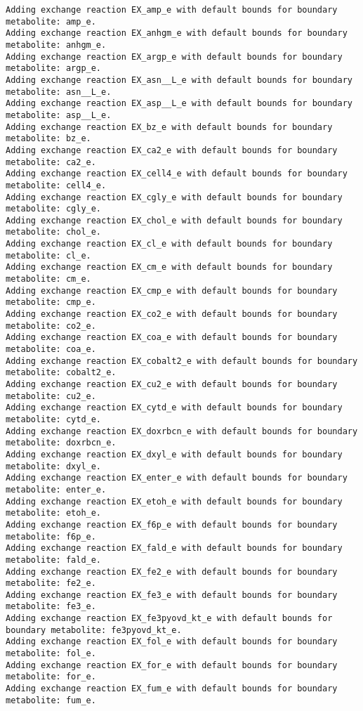 \documentclass[
  letterpaper,
  DIV=11,
  numbers=noendperiod]{scrartcl}
\begin{document}
\begin{verbatim}
Adding exchange reaction EX_amp_e with default bounds for boundary metabolite: amp_e.
Adding exchange reaction EX_anhgm_e with default bounds for boundary metabolite: anhgm_e.
Adding exchange reaction EX_argp_e with default bounds for boundary metabolite: argp_e.
Adding exchange reaction EX_asn__L_e with default bounds for boundary metabolite: asn__L_e.
Adding exchange reaction EX_asp__L_e with default bounds for boundary metabolite: asp__L_e.
Adding exchange reaction EX_bz_e with default bounds for boundary metabolite: bz_e.
Adding exchange reaction EX_ca2_e with default bounds for boundary metabolite: ca2_e.
Adding exchange reaction EX_cell4_e with default bounds for boundary metabolite: cell4_e.
Adding exchange reaction EX_cgly_e with default bounds for boundary metabolite: cgly_e.
Adding exchange reaction EX_chol_e with default bounds for boundary metabolite: chol_e.
Adding exchange reaction EX_cl_e with default bounds for boundary metabolite: cl_e.
Adding exchange reaction EX_cm_e with default bounds for boundary metabolite: cm_e.
Adding exchange reaction EX_cmp_e with default bounds for boundary metabolite: cmp_e.
Adding exchange reaction EX_co2_e with default bounds for boundary metabolite: co2_e.
Adding exchange reaction EX_coa_e with default bounds for boundary metabolite: coa_e.
Adding exchange reaction EX_cobalt2_e with default bounds for boundary metabolite: cobalt2_e.
Adding exchange reaction EX_cu2_e with default bounds for boundary metabolite: cu2_e.
Adding exchange reaction EX_cytd_e with default bounds for boundary metabolite: cytd_e.
Adding exchange reaction EX_doxrbcn_e with default bounds for boundary metabolite: doxrbcn_e.
Adding exchange reaction EX_dxyl_e with default bounds for boundary metabolite: dxyl_e.
Adding exchange reaction EX_enter_e with default bounds for boundary metabolite: enter_e.
Adding exchange reaction EX_etoh_e with default bounds for boundary metabolite: etoh_e.
Adding exchange reaction EX_f6p_e with default bounds for boundary metabolite: f6p_e.
Adding exchange reaction EX_fald_e with default bounds for boundary metabolite: fald_e.
Adding exchange reaction EX_fe2_e with default bounds for boundary metabolite: fe2_e.
Adding exchange reaction EX_fe3_e with default bounds for boundary metabolite: fe3_e.
Adding exchange reaction EX_fe3pyovd_kt_e with default bounds for boundary metabolite: fe3pyovd_kt_e.
Adding exchange reaction EX_fol_e with default bounds for boundary metabolite: fol_e.
Adding exchange reaction EX_for_e with default bounds for boundary metabolite: for_e.
Adding exchange reaction EX_fum_e with default bounds for boundary metabolite: fum_e.

\end{verbatim}
\end{document}
